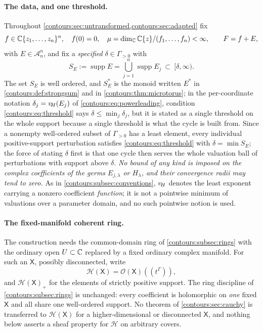 \documentclass[11pt,letterpaper]{article}
\theoremstyle{definition}
\theoremstyle{remark}
\newcommand{\HH}{\mathcal H}\newcommand{\A}{\mathscr A}\newcommand{\OO}{\mathcal O}
\newcommand{\supp}{\operatorname{supp}}\newcommand{\Res}{\operatorname{Res}}
\numberwithin{equation}{section}
\begin{document}
\paragraph{The data, and one threshold.}
Throughout \cref{contours:sec:untransformed,contours:sec:adapted} fix
\begin{equation}\label{contours:eq:untransformeddata}
  f\in\mathbb C\{z_1,\ldots,z_n\}^n,\quad f(0)=0,\quad
  \mu=\dim_\mathbb C\mathbb C\{z\}/(f_1,\ldots,f_n)<\infty,
  \qquad F=f+E,
\end{equation}
with $E\in\A_n^n$, and fix a \emph{specified} $\delta\in\Gamma_{>0}$ with
\begin{equation}\label{contours:eq:threshold}
  S_E:=\supp E=\bigcup_{j=1}^n\supp E_j\ \subset\ [\delta,\infty).
\end{equation}
The set $S_E$ is well ordered, and $S_E^*$ is the monoid written $E^*$ in
\cref{contours:def:strongsum} and in \cref{contours:thm:microtorus}; in the
per-coordinate notation $\delta_j=v_{\!H}(E_j)$ of \eqref{contours:eq:powerleading},
condition \eqref{contours:eq:threshold} says $\delta\le\min_j\delta_j$, but it is
stated as a single threshold on the whole support because a single threshold is
what the cycle is built from. Since a
nonempty well-ordered subset of $\Gamma_{>0}$ has a least element, every
individual positive-support perturbation satisfies
\eqref{contours:eq:threshold} with $\delta=\min S_E$; the force of stating
$\delta$ first is that one cycle then serves the whole valuation ball of
perturbations with support above $\delta$. \emph{No bound of any kind is imposed
on the complex coefficients of the germs $E_{j,\lambda}$ or $H_\lambda$, and
their convergence radii may tend to zero.} As in
\cref{contours:subsec:conventions}, $v_{\!H}$ denotes the least exponent carrying a
nonzero coefficient \emph{function}; it is not a pointwise minimum of valuations
over a parameter domain, and no such pointwise notion is used.

\paragraph{The fixed-manifold coherent ring.}
The construction needs the common-domain ring of
\cref{contours:subsec:rings} with the ordinary open $U\subset\mathbb C$ replaced by a
fixed ordinary complex manifold. For such an $\mathsf X$, possibly
disconnected, write
\begin{equation}\label{contours:eq:HXring}
  \HH(\mathsf X)=\OO(\mathsf X)((t^\Gamma)),
\end{equation}
and $\HH(\mathsf X)_+$ for the elements of strictly positive support. The ring
discipline of \cref{contours:subsec:rings} is unchanged: every coefficient is
holomorphic on \emph{one} fixed $\mathsf X$ and all share one well-ordered
support. No theorem of \cref{contours:sec:cauchy} is transferred to
$\HH(\mathsf X)$ for a higher-dimensional or disconnected $\mathsf X$, and
nothing below asserts a sheaf property for $\HH$ on arbitrary covers.
\end{document}
